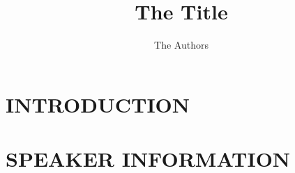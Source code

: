 \documentclass[12pt,twoside,dvips]{article}
\title{The Title}
\author{The Authors}
\begin{document}
\maketitle

\section{INTRODUCTION}



\section{SPEAKER INFORMATION} 
\end{document}
